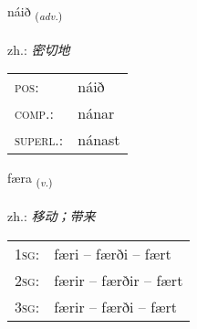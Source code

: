\documentclass[frontgrid, backgrid]{flacards}\usepackage[]{graphicx}\usepackage[]{xcolor}
\begin{document}
\renewcommand{\blhead}{\vskip5pt {\small\bfseries\footnotesize Atviksorð | 副词 }}
\renewcommand{\bcfoot}{\vskip5pt \hspace{2pt}{\small\bfseries\footnotesize 1K}}


{náið \small{\textsubscript{(\textit{adv.})}} \\[1ex] %
\textphonetic{[nauːɪð]} \\
zh.: \emph{密切地} \\  [2ex]
\renewcommand*{\arraystretch}{0.8}
\begin{tabular}{ll}
\textsc{pos}: & náið \\ 
\textsc{comp.}: & nánar \\ 
\textsc{superl.}: & nánast \\
\end{tabular}
}

\renewcommand{\flhead}{\vskip5pt \fboxsep=0pt {\small\bfseries\footnotesize Sagnorð | 动词}}
\renewcommand{\fcfoot}{\vskip5pt \fboxsep=0pt \hspace{2pt}{\small\bfseries\footnotesize 1K}}

\renewcommand{\blhead}{\vskip5pt {\small\bfseries\footnotesize Sagnorð | 动词 }}
\renewcommand{\bcfoot}{\vskip5pt \hspace{2pt}{\small\bfseries\footnotesize 1K}}


{færa \small{\textsubscript{(\textit{v.})}} \\[1ex] %
\textphonetic{[faiːra]} \\
zh.: \emph{移动；带来} \\  [2ex]
\renewcommand*{\arraystretch}{0.8}
\begin{tabular}{p{1cm}l}
\textsc{1sg}: & færi -- færði -- fært \\ 
\textsc{2sg}: & færir -- færðir -- fært \\ 
\textsc{3sg}: & færir -- færði -- fært \\ 
\end{tabular}
}

\end{document}
